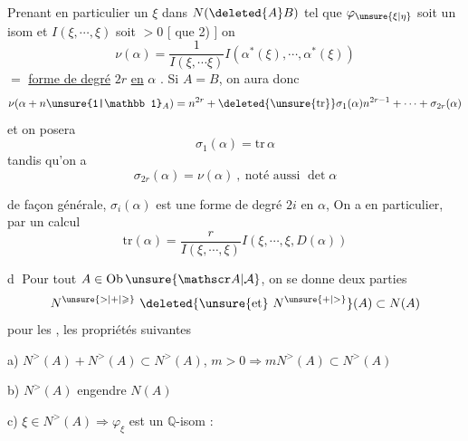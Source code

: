 Prenant en particulier  un $\xi$ dans $N(\deleted{A}B)$ tel que $\varphi_{\unsure{\xi|\eta}}$ soit un isom et $I(\xi,\cdots,\xi)$ soit $>0$ [  que 2) ] on 
\[
\nu(\alpha)=\frac{1}{I(\xi,\cdots\xi)}I(\alpha^*(\xi),\cdots,\alpha^*(\xi))
\]
$={}$ \uline{forme de degré} $2r$ \uline{en} $\alpha$ . Si $A=B$, on aura donc
\[
\nu(\alpha+n\unsure{1|\mathbb 1}_A)=n^{2r}+\deleted{\unsure{\mathrm{tr}}}\sigma_1(\alpha)n^{2r-1}+\cdots+\sigma_{2r}(\alpha)
\]
et on posera
\[
\sigma_1(\alpha)=\mathrm{tr}\,\alpha
\]
tandis qu'on a
\[
\sigma_{2r}(\alpha)=\nu(\alpha)\ ,\ \text{noté aussi }\det\alpha
\]



de façon générale,  $\sigma_i(\alpha)$ est une forme de degré $2i$ en $\alpha$, On a en particulier, par un calcul 
\[
\mathrm{tr}(\alpha)=\frac{r}{I(\xi,\cdots,\xi)}I(\xi,\cdots,\xi,D(\alpha))
\]

\textcircled{d} Pour tout $A\in\mathrm{Ob}\,\unsure{\mathscr A|\mathcal A}$, on se donne deux parties
\[
N^{\unsure{>|+|\geqslant}}\ \deleted{\text{\unsure{et}}\ N^{\unsure{+|>}}}(A)\subset N(A)
\]
  pour les ,  les propriétés suivantes


a) $N^>(A)+N^>(A)\subset N^>(A)$,  $m>0\Rightarrow mN^>(A)\subset N^>(A)$

b) $N^>(A)$ engendre $N(A)$


c) $\xi\in N^>(A)\Longrightarrow\varphi_\xi$ \unsure{$\xi$} est un $\mathbb Q$-isom :


